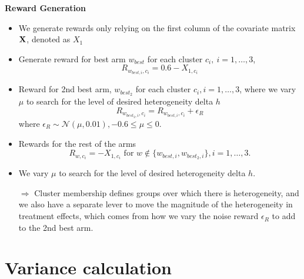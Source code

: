 \documentclass[letterpaper, 12pt, parskip=full,DIV=10]{scrartcl}
\begin{document}
\textbf{Reward Generation}
\begin{itemize}
   \item We generate rewards only relying on the first column of the covariate matrix $\mathbf{X}$, denoted as $X_1$
    \item Generate reward for best arm $w_{best}$ for each cluster $c_i,  \ i = 1, \dots, 3$, \[R_{w_{best, i}, c_i} = 0.6 - X_{1, c_i}\]
    \item Reward for 2nd best arm, $w_{best_2}$ for each cluster $c_i,  i = 1, \dots, 3$, where we vary $\mu$ to search for the level of desired heterogeneity delta $h$
    $$R_{w_{best_2, i}, c_i} = R_{w_{best, i}, c_i} + \epsilon_R $$ where $\epsilon_R \sim \mathcal{N}(\mu, 0.01), -0.6 \le \mu \le 0$. 
    \item Rewards for the rest of the arms
    $$R_{w, c_i} = -X_{1, c_i} \mbox{ for }  w \not\in \{w_{best, i}, w_{best_2, i}\}, i = 1, \dots, 3.$$
    \item We vary $\mu$ to search for the level of desired heterogeneity delta $h$.
        \item[$\Rightarrow$] Cluster membership defines groups over which there is heterogeneity, and we also have a separate lever to move the magnitude of the heterogeneity in treatment effects, which comes from how we vary the noise reward $\epsilon_R$ to add to the 2nd best arm. 
\end{itemize}

\section{Variance calculation}


\end{document}
